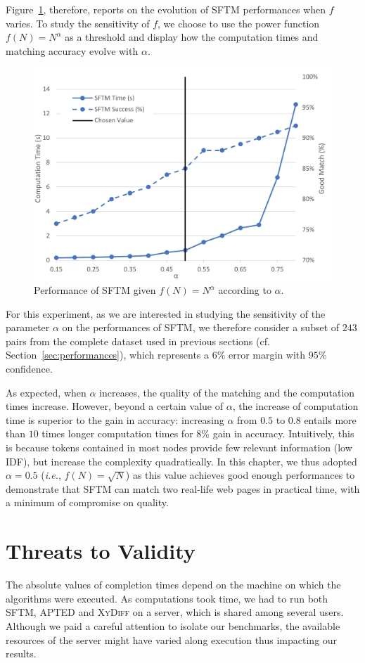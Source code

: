Figure~\ref{fig:parameter}, therefore, reports on the evolution of SFTM performances when $f$ varies.
To study the sensitivity of $f$, we choose to use the power function $f(N) = N^\alpha$ as a threshold and display how the computation times and matching accuracy evolve with $\alpha$.

\begin{figure}
    \centering
    \includegraphics[width=.8\linewidth]{tree-matching/graphs/sensitivity}
    \caption{Performance of SFTM given $f(N) = N^\alpha$ according to $\alpha$.}
    \label{fig:parameter}
\end{figure}

For this experiment, as we are interested in studying the sensitivity of the parameter $\alpha$ on the performances of SFTM, we therefore consider a subset of $243$ pairs from the complete dataset used in previous sections (cf. Section~\ref{sec:performances}), which represents a $6\%$ error margin with $95\%$ confidence.

As expected, when $\alpha$ increases, the quality of the matching and the computation times increase.
However, beyond a certain value of $\alpha$, the increase of computation time is superior to the gain in accuracy: increasing $\alpha$ from $0.5$ to $0.8$ entails more than $10$ times longer computation times for $8\%$ gain in accuracy. 
Intuitively, this is because tokens contained in most nodes provide few relevant information (low IDF), but increase the complexity quadratically.
In this chapter, we thus adopted $\alpha = 0.5$ (\emph{i.e.}, $f(N) = \sqrt{N}$) as this value achieves good enough performances to demonstrate that SFTM can match two real-life web pages in practical time, with a minimum of compromise on quality.  

\section{Threats to Validity}\label{sec:threats}
The absolute values of completion times depend on the machine on which the algorithms were executed.
As computations took time, we had to run both SFTM, APTED and \textsc{XyDiff} on a server, which is shared among several users.
Although we paid a careful attention to isolate our benchmarks, the available resources of the server might have varied along execution thus impacting our results.

